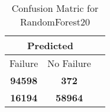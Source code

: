 \begin{table}[] 
\caption{Confusion Matric for RandomForest20} 
\label{Table: Prediction Accuracy-DMDRandomForest20OnlySunEKF-ignoreReflectionEKF-top2perfectNoFailurePrediction-Reflection} 
\centering 
\begin{tabular} 
 {@{}ccc@{}} 
\toprule 
\multicolumn{2}{c}{\textbf{Predicted}}
 \\ \midrule 
\multicolumn{1}{|c|}{Failure} & 
\multicolumn{1}{c|}{No Failure}
 \\ \midrule 
\multicolumn{1}{|c|}{\color{green}\textbf{94598}} & 
\multicolumn{1}{c|}{\color{red}\textbf{372}}
 \\ \midrule 
\multicolumn{1}{|c|}{\color{red}\textbf{16194}} & 
\multicolumn{1}{c|}{\color{green}\textbf{58964}}
 \\ \bottomrule 
\end{tabular} 
\end{table} 
